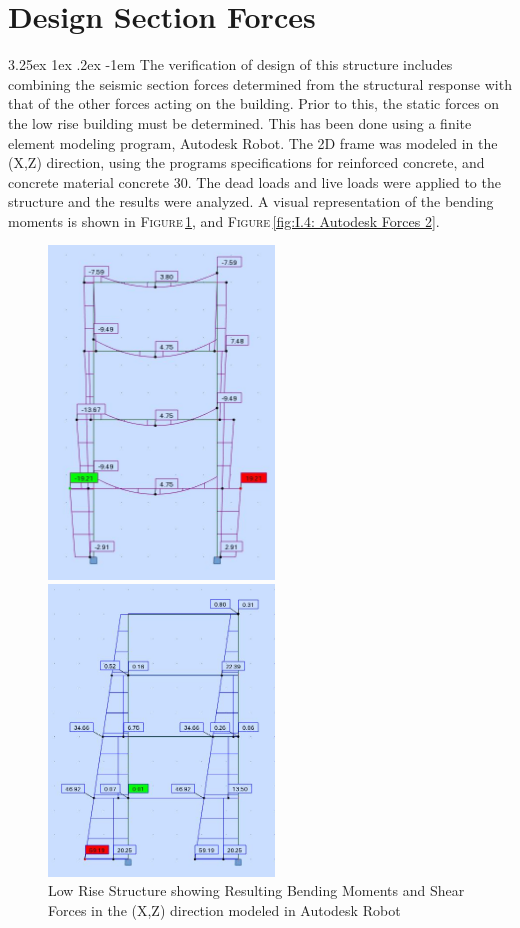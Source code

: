 \documentclass[11pt,a4paper,titlepage]{report}
\makeatletter
\renewcommand\paragraph{\@startsection{paragraph}{5}{\z@}%
  {3.25ex \@plus1ex \@minus.2ex}%
  {-1em}%
  {\normalfont\normalsize\bfseries}}
\makeatother
\begin{document}
\section{Design Section Forces}
\paragraph{}The verification of design of this structure includes combining the seismic section forces determined from the structural response with that of the other forces acting on the building. Prior to this, the static forces on the low rise building must be determined. This has been done using a finite element modeling program, Autodesk Robot. The 2D frame was modeled in the (X,Z) direction, using the programs specifications for reinforced concrete, and concrete material concrete 30. The dead loads and live loads were applied to the structure and the results were analyzed. A visual representation of the bending moments is shown in \textsc{Figure}\,\ref{fig:I.4: Autodesk Forces 1}, and \textsc{Figure}\,\ref{fig:I.4: Autodesk Forces 2}.
\begin{figure}
\begin{minipage}{0.49\textwidth}
    \centering
    \includegraphics[width=6cm]{Nat_My.JPG}
\end{minipage}
\begin{minipage}{0.49\textwidth}
    \centering
    \includegraphics[width=6cm]{Nat_Fx.JPG}
\end{minipage}
    \caption{Low Rise Structure showing Resulting Bending Moments and Shear Forces in the (X,Z) direction  modeled in Autodesk Robot}
      \label{fig:I.4: Autodesk Forces 1}
\end{figure}
\end{document}
